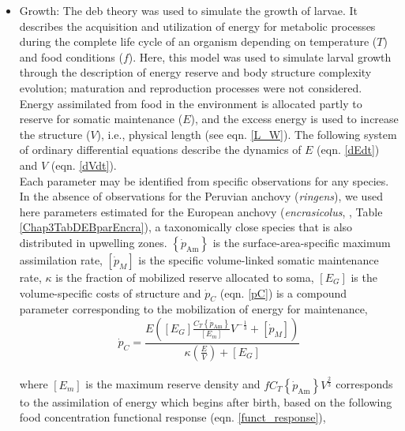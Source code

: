 \begin{itemize}

\item Growth: The \acrshort{deb} theory \citep{Kooi2009} was used to simulate the growth of larvae. It describes the acquisition and utilization of energy for metabolic processes during the complete life cycle of an organism depending on temperature ($T$) and food conditions ($f$). Here, this model was used to simulate larval growth through the description of energy reserve and body structure complexity evolution; maturation and reproduction processes were not considered. Energy assimilated from food in the environment is allocated partly to reserve for somatic maintenance ($E$), and the excess energy is used to increase the structure ($V$), i.e., physical length (see eqn. \ref{L_W}). The following system of ordinary differential equations describe the dynamics of $E$ (eqn. \ref{dEdt}) and $V$ (eqn. \ref{dVdt}).\\

Each parameter may be identified from specific observations for any species. In the absence of observations for the Peruvian anchovy (\textit{\gls{ringens}}), we used here parameters estimated for the European anchovy (\textit{\gls{encrasicolus}}, \cite{PethRoos2013}	, Table \ref{Chap3TabDEBparEncra}), a taxonomically close species that is also distributed in upwelling zones. $\left \{ \dot{p}_\mathrm{Am} \right \}$ is the surface-area-specific maximum assimilation rate, $\left [ \dot{p}_{M} \right ]$ is the specific volume-linked somatic maintenance rate, $\kappa$ is the fraction of mobilized reserve allocated to soma, ${\left [ E_{G} \right ]}$ is the volume-specific costs of structure and $\dot{p}_{C}$ (eqn. \ref{pC}) is a compound parameter corresponding to the mobilization of energy for maintenance,\\

\begin{equation}
	\dot{p}_{C} = \frac
					   {E\left ( \left [ E_{G} \right ] \frac{C_{T}\left \{ \dot{p}_\mathrm{Am} \right \}}{\left [ E_{m} \right ]} V^{-\frac{1}{3}}+\left [ \dot{p}_{M} \right ]\right )}
					   {\kappa\left ( \frac{E}{V} \right ) + \left [ E_{G} \right ]}
	\label{pC}
\end{equation}\\

where $\left[ E_{m} \right]$ is the maximum reserve density and $fC_{T}\left \{ \dot{p}_\mathrm{Am} \right \}V^{\frac{2}{3}}$ corresponds to the assimilation of energy which begins after birth, based on the following food concentration functional response (eqn. \ref{funct_response}),\\


\end{itemize}
